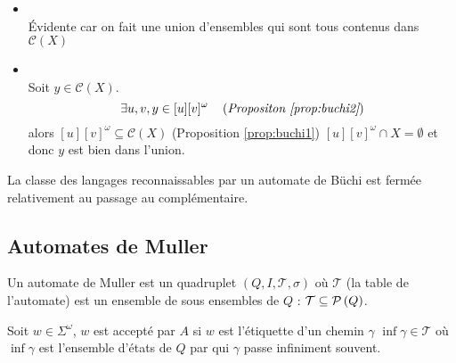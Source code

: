 \begin{proofI}
	\begin{itemize}
		\item \fbox{$\supseteq$} \\
		      Évidente car on fait une union d'ensembles qui sont tous contenus dans $\mathcal C (X)$
		\item \fbox{$\subseteq$} \\
		      Soit $y \in \mathcal C (X)$.
		      $$\exists u,v, y \in [u][v]^{\omega} \quad\left(\textit{Propositon \ref{prop:buchi2}}\right)$$
		      alors $[u][v]^{\omega} \subseteq \mathcal C (X)$ (Proposition \ref{prop:buchi1})
		      \cad $[u][v]^{\omega} \cap X = \emptyset$ et donc $y$ est bien dans l'union.
	\end{itemize}
\end{proofI}

\begin{coro}
	La classe des langages reconnaissables par un automate de Büchi est fermée relativement au passage au complémentaire.
\end{coro}


\subsection{Automates de Muller}

\begin{definition}
	Un automate de Muller est un quadruplet $(Q,I, \mathcal T, \sigma)$ où $\mathcal T$ (la table de l'automate) est un ensemble de sous ensembles
	de $Q$ : $\mathcal T \subseteq \mathcal{P}\left(Q\right)$.

	Soit $w \in \Sigma^{\omega}$, $w$ est accepté par $A$ si $w$ est l'étiquette d'un chemin $\gamma$ \tq $\inf {\gamma} \in \mathcal T$ où
	$\inf {\gamma}$ est l'ensemble d'états de $Q$ par qui $\gamma$ passe infiniment souvent.

\end{definition}
